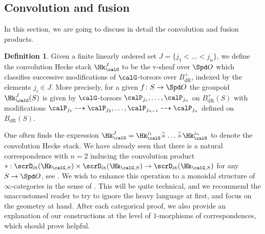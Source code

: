 \documentclass[10pt, reqno]{amsart}
\theoremstyle{plain}
\theoremstyle{definition}
\newtheorem{definition}[theorem]{Definition}
\numberwithin{equation}{section}
\begin{document}
	\subsection{Convolution and fusion}\label{sec:conv_fusion}
	
	In this section, we are going to discuss in detail the convolution and fusion products.
	
	\begin{definition}
		\label{sec:convolution-fusion-definition-convolution-hecke-stack}
		Given a finite linearly ordered set $J=\{j_1<\dots <j_n\}$, we define the convolution Hecke stack $\Hk_\calG^{J}$ to be the v-sheaf over $\Spd O$ which classifies successive modifications of $\calG$-torsors over $B_{\mathrm{dR}}^+$, indexed by the elements $j_i \in J$. More precisely, for a given $f\colon S\to \Spd O$ the groupoid $\Hk_\calG^J(S)$ is given by $\calG$-torsors $\calP_{j_1}, \ldots, \calP_{j_n}$ on $B^+_{\mathrm{dR}}(S)$ with modifications $\calP_{j_1}\dashrightarrow \calP_{j_2},\ldots, \calP_{j_{n-1}}\dashrightarrow\calP_{j_n}$ defined on $B_{\mathrm{dR}}(S)$.
	\end{definition}
	
	One often finds the expression $\Hk_\calG^{J}=\Hk_\calG^{j_1} \tilde{\times} \dots \tilde{\times} \Hk_\calG^{j_n}$ to denote the convolution Hecke stack. We have already seen that there is a natural correspondence with $n=2$ inducing the convolution product $\ast : \scrD_{\mathrm{\acute{e}t}}(\Hk_{\calG,S}) \times \scrD_{\mathrm{\acute{e}t}}(\Hk_{\calG,S}) \to \scrD_{\mathrm{\acute{e}t}}(\Hk_{\calG,S})$ for any $S\to \Spd O$, see .  We wish to enhance this operation to a monoidal structure of $\infty$-categories in the sense of \cite[Definition 4.1.1.10]{Lur17}. This will be quite technical, and we recommend the unaccustomed reader to try to ignore the heavy language at first, and focus on the geometry at hand. After each categorical proof, we also provide an explanation of our constructions at the level of $1$-morphisms of correspondences, which should prove helpful.
	
\end{document}
